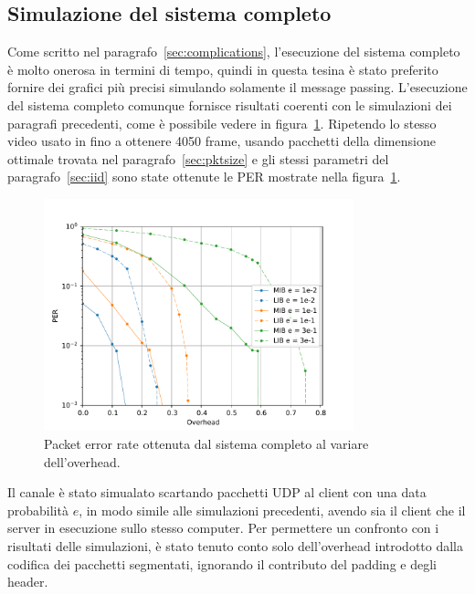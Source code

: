 \documentclass[italian, a4paper, 12pt]{article}
\begin{document}
\subsection{Simulazione del sistema completo}
Come scritto nel paragrafo~\ref{sec:complications}, l'esecuzione
del sistema completo è molto onerosa in termini di tempo, quindi in
questa tesina è stato preferito fornire dei grafici più precisi
simulando solamente il message passing.
%
L'esecuzione del sistema completo comunque fornisce risultati coerenti
con le simulazioni dei paragrafi precedenti, come è possibile vedere
in figura~\ref{fig:iid_real}.
%
Ripetendo lo stesso video usato in \cite{uep} fino a ottenere 4050
frame, usando pacchetti della dimensione ottimale trovata nel
paragrafo~\ref{sec:pktsize} e gli stessi parametri del
paragrafo~\ref{sec:iid} sono state ottenute le PER mostrate nella
figura~\ref{fig:iid_real}.
%
\begin{figure}[H]
  \centering
  \includegraphics[width=0.8\textwidth]{plot_iid_real}
  \caption{Packet error rate ottenuta dal sistema completo al variare
    dell'overhead.}
  \label{fig:iid_real}
\end{figure}
%
Il canale è stato simualato scartando pacchetti UDP al client con una
data probabilità $e$, in modo simile alle simulazioni precedenti,
avendo sia il client che il server in esecuzione sullo stesso
computer.
%
Per permettere un confronto con i risultati delle simulazioni, è stato
tenuto conto solo dell'overhead introdotto dalla codifica dei
pacchetti segmentati, ignorando il contributo del padding e degli
header.

\newpage
\end{document}
